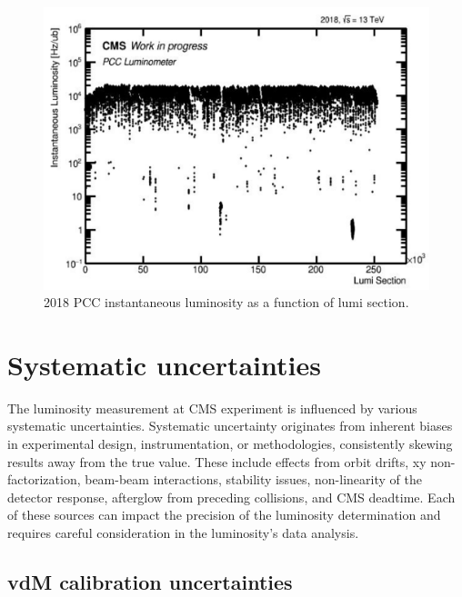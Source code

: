 \begin{figure}[!htp]
\centering
\includegraphics[width=1\textwidth]{ashish_thesis/PCClumivslumisection_2018_1.png}
\caption[2018 PCC Inst. Luminosity]{%
 2018 PCC instantaneous luminosity as a function of lumi section.
}
\label{fig:PCC_inst_2018}
\end{figure}

\newpage
\section{Systematic uncertainties}

The luminosity measurement at CMS experiment is influenced by various systematic uncertainties. Systematic uncertainty originates from inherent biases in experimental design, instrumentation, or methodologies, consistently skewing results away from the true value. These include effects from orbit drifts, xy non-factorization, beam-beam interactions, stability issues, non-linearity of the detector response, afterglow from preceding collisions, and CMS deadtime. Each of these sources can impact the precision of the luminosity determination and requires careful consideration in the luminosity's data analysis.

\subsection{vdM calibration uncertainties}

